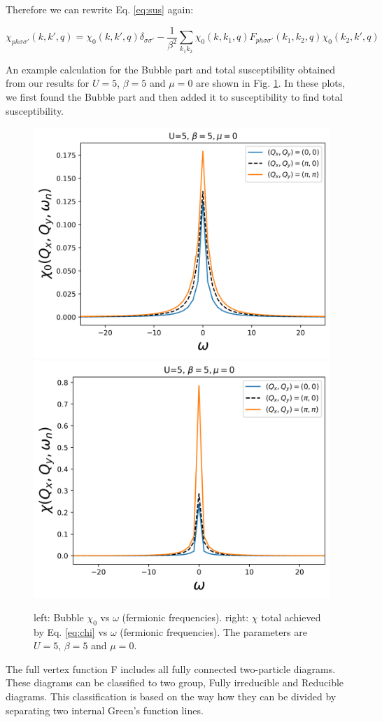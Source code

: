\noindent Therefore we can rewrite Eq. \ref{eq:sus} again:

\begin{equation}
    \chi_{ph\sigma \sigma '}(k,k',q)= \chi_{0}(k,k',q)\delta _{\sigma \sigma'} -\frac{1}{\beta ^2} \sum _{k_1 k_2} \chi_{0}(k,k_1,q) F_{ph \sigma \sigma '} (k_1,k_2,q) \chi_{0}(k_2,k',q)
    \label{eq:chi}
\end{equation}

An example calculation for the Bubble part and total susceptibility obtained from our results for $U=5$, $\beta=5$ and $\mu=0$ are shown in Fig. \ref{fig:correlation}. In these plots, we first found the Bubble part and then added it to susceptibility to find total susceptibility.

\begin{figure}[ht]
\centering
    \includegraphics[width=0.45\linewidth]{fig2/chi_b.png}
    \includegraphics[width=0.45\linewidth]{fig2/chi_tot.png}
\caption{left: Bubble $\chi_0 $ vs $\omega$ (fermionic frequencies). right: $\chi$ total achieved by Eq. \ref{eq:chi} vs $\omega$ (fermionic frequencies). The parameters are $U=5$, $\beta=5$ and $\mu=0$. 
\label{fig:correlation}}
\end{figure}

The full vertex function F includes all fully connected two-particle diagrams. These diagrams can be classified to two group, Fully irreducible and Reducible diagrams. This classification is based on the way how they can be divided by separating two internal Green's function lines.



